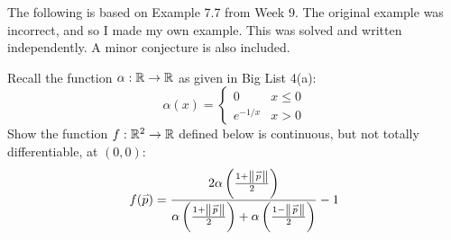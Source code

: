 The following is based on Example 7.7 from Week 9.
The original example was incorrect, and so I made my own example.
This was solved and written independently.
A minor conjecture is also included.

\begin{exr}[num=7.7]
    Recall the function $ \alpha: \mathbb{R} \rightarrow \mathbb{R} $ as given in Big
    List 4(a):
    \begin{equation*}
    \alpha(x) = \begin{cases} 0 & x \leq 0 \\ e^{-1/x} & x > 0 \end{cases}
    \end{equation*}
    Show the function $ f: \mathbb{R}^{2} \rightarrow \mathbb{R} $ defined below is
    continuous, but not totally differentiable, at $ (0, 0) $:
    \begin{equation*}
        f(\vec p) = \frac{2\alpha\left(\frac{1+\norm{\vec p}}{2}\right)}
        {\alpha\left( \frac{1+\norm{\vec p}}{2}\right)
        + \alpha\left( \frac{1 - \norm{\vec p}}{2} \right)} - 1
    \end{equation*}
\end{exr}
\vspace{-0.2in}

